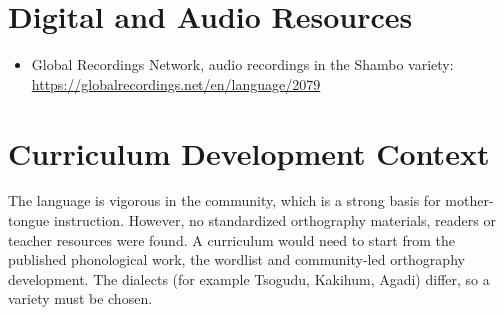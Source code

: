\documentclass[12pt]{article}
\begin{document}
\section{Digital and Audio Resources}
\begin{itemize}
\item Global Recordings Network, audio recordings in the Shambo variety: \url{https://globalrecordings.net/en/language/2079}
\end{itemize}

\section{Curriculum Development Context}
The language is vigorous in the community, which is a strong basis for mother-tongue instruction. However, no standardized orthography materials, readers or teacher resources were found. A curriculum would need to start from the published phonological work, the wordlist and community-led orthography development. The dialects (for example Tsogudu, Kakihum, Agadi) differ, so a variety must be chosen.
\end{document}
